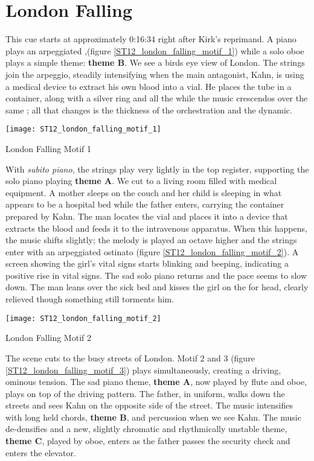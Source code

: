 
\section{London Falling}
This cue starts at approximately 0:16:34 right after Kirk's reprimand. A piano plays an arpeggiated \bflatm,(figure \ref{ST12_london_falling_motif_1}) while a solo oboe plays a simple theme: \textbf{theme B}. We see a birds eye view of London. The strings join the arpeggio, steadily intensifying when the main antagonist, Kahn, is using a medical device to extract his own blood into a vial. He places the tube in a container, along with a silver ring and all the while the music crescendos over the same \bflatm; all that changes is the thickness of the orchestration and the dynamic. 
\begin{marginfigure}
\texttt{[image: ST12\_london\_falling\_motif\_1]}
	\caption{London Falling Motif 1}
	\label{ST12_london_falling_motif_1}
\end{marginfigure}

With \textit{subito piano}, the strings play very lightly in the top register, supporting the solo piano playing \textbf{theme A}. We cut to a living room filled with medical equipment. A mother sleeps on the couch and her child is sleeping in what appears to be a hospital bed while the father enters, carrying the container prepared by Kahn. The man locates the vial and places it into a device that extracts the blood and feeds it to the intravenous apparatus. When this happens, the music shifts slightly; the melody is played an octave higher and the strings enter with an arpeggiated ostinato (figure \ref{ST12_london_falling_motif_2}). A screen showing the girl's vital signs starts blinking and beeping, indicating a positive rise in vital signs. The sad solo piano returns and the pace seems to slow down. The man leans over the sick bed and kisses the girl on the for head, clearly relieved though something still torments him. 

\begin{marginfigure}
\texttt{[image: ST12\_london\_falling\_motif\_2]}
	\caption{London Falling Motif 2}
	\label{ST12_london_falling_motif_2}
\end{marginfigure}

The scene cuts to the busy streets of London. Motif 2 and 3 (figure \ref{ST12_london_falling_motif_3}) plays simultaneously, creating a driving, ominous tension. The sad piano theme, \textbf{theme A}, now played by flute and oboe, plays on top of the driving pattern. The father, in uniform, walks down the streets and sees Kahn on the opposite side of the street. The music intensifies with long held chords, \textbf{theme B}, and percussion when we see Kahn. The music de-densifies and a new, slightly chromatic and rhythmically unstable theme, \textbf{theme C}, played by oboe, enters as the father passes the security check and enters the elevator.

